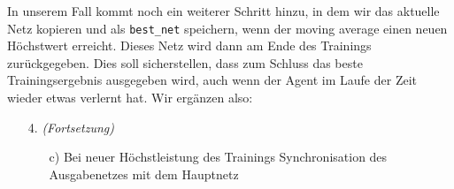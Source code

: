In unserem Fall kommt noch ein weiterer Schritt hinzu, in dem wir das aktuelle Netz kopieren und als \texttt{best_net} speichern, wenn der moving average einen neuen Höchstwert erreicht. Dieses Netz wird dann am Ende des Trainings zurückgegeben. Dies soll sicherstellen, dass zum Schluss das beste Trainingsergebnis ausgegeben wird, auch wenn der Agent im Laufe der Zeit wieder etwas verlernt hat. Wir ergänzen also:
\begin{enumerate}
    \item[4.] \textit{(Fortsetzung)} 
    \begin{enumerate}
        \item[c)] Bei neuer Höchstleistung des Trainings Synchronisation des Ausgabenetzes mit dem Hauptnetz
    \end{enumerate}
\end{enumerate}


